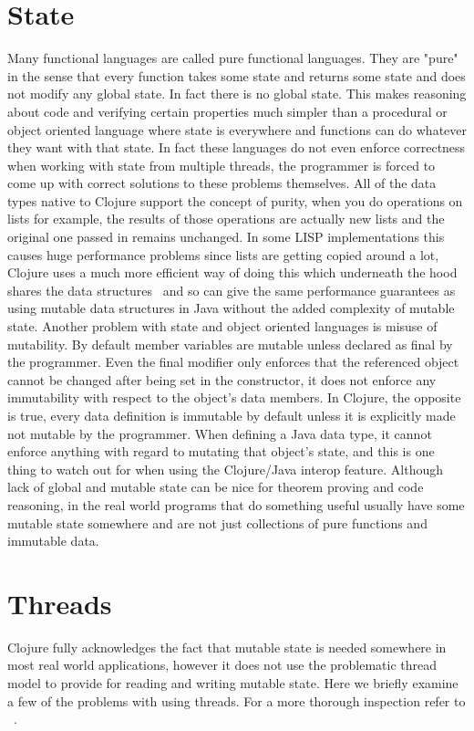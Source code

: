 \section{State}
Many functional languages are called pure functional languages. They are "pure" in the sense that every function takes some state and returns some state and does not modify any global state. In fact there is no global state. This makes reasoning about code and verifying certain properties much simpler than a procedural or object oriented language where state is everywhere and functions can do whatever they want with that state. In fact these languages do not even enforce correctness when working with state from multiple threads, the programmer is forced to come up with correct solutions to these problems themselves. All of the data types native to Clojure support the concept of purity, when you do operations on lists for example, the results of those operations are actually new lists and the original one passed in remains unchanged. In some LISP implementations this causes huge performance problems since lists are getting copied around a lot, Clojure uses a much more efficient way of doing this which underneath the hood shares the data structures~\cite{cljDataStructures} and so can give the same performance guarantees as using mutable data structures in Java without the added complexity of mutable state. Another problem with state and object oriented languages is misuse of mutability. By default member variables are mutable unless declared as final by the programmer. Even the final modifier only enforces that the referenced object cannot be changed after being set in the constructor, it does not enforce any immutability with respect to the object's data members. In Clojure, the opposite is true, every data definition is immutable by default unless it is explicitly made not mutable by the programmer. When defining a Java data type, it cannot enforce anything with regard to mutating that object's state, and this is one thing to watch out for when using the Clojure/Java interop feature. Although lack of global and mutable state can be nice for theorem proving and code reasoning, in the real world programs that do something useful usually have some mutable state somewhere and are not just collections of pure functions and immutable data.  

\section{Threads}
Clojure fully acknowledges the fact that mutable state is needed somewhere in most real world applications, however it does not use the problematic thread model to provide for reading and writing mutable state. Here we briefly examine a few of the problems with using threads. For a more thorough inspection refer to ~\cite{1076522}.

